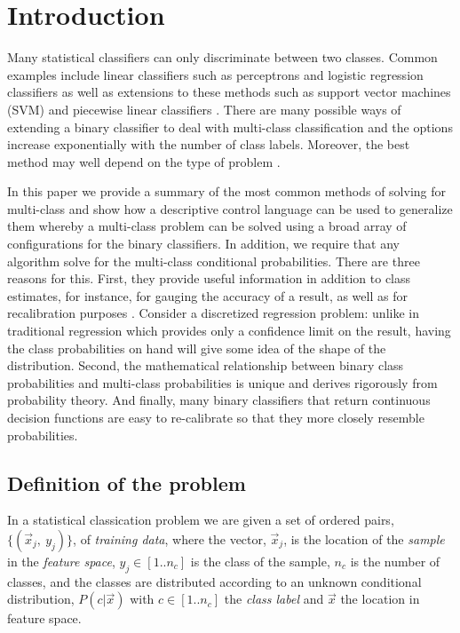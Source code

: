 \section{Introduction}

Many statistical classifiers can only discriminate between two classes.
Common examples include linear classifiers such as perceptrons and
logistic regression classifiers \citep{Michie_etal1994} as well as extensions
to these methods such as support vector machines (SVM) \citep{Mueller_etal2001} and 
piecewise linear classifiers \citep{Bagirov2005,Mills2018}.
There are many possible ways of extending a binary classifier to deal
with multi-class classification and the options increase exponentially
with the number of class labels.
Moreover, the best method may well depend on the type of problem
\citep{Dietterich_Bakiri1995,Allwein_etal2000}.

In this paper we provide a summary of the most common methods of solving for 
multi-class and show how a descriptive control language can be used to 
generalize them whereby a multi-class problem
can be solved using a broad array of configurations for the binary
classifiers. 
In addition, we require that any algorithm solve 
for the multi-class conditional probabilities.
There are three reasons for this.
First, they provide useful information
in addition to class estimates,
for instance, for gauging the accuracy of a result, as well as for recalibration
purposes \citep{Mills2009}.
Consider a discretized regression problem: unlike in traditional regression
which provides only a confidence limit on the result,
having the class probabilities on hand will give some idea of the
shape of the distribution.
Second, the mathematical relationship between binary class
probabilities and multi-class probabilities is unique and
derives rigorously from probability theory.
And finally, many binary classifiers that return continuous decision functions
are easy to re-calibrate so that they more closely resemble probabilities.

\subsection{Definition of the problem}

\label{description}

In a statistical classication problem we are given a set of ordered pairs, 
$\lbrace (\vec x_j,~ y_j) \rbrace$, of {\it training data},
where the vector, $\vec x_j$, is the location of the {\it sample} in 
the {\it feature space},
$y_j \in [1..n_c]$ is the class of the sample,
$n_c$ is the number of classes,
and the classes are
distributed according to an unknown conditional distribution,
$P(c | \vec x)$ with $c \in [1..n_c]$ the {\it class label} and $\vec x$ the location
in feature space.

